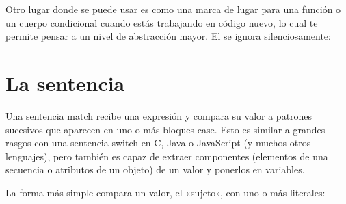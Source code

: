 \documentclass[a5paper,10pt,spanish]{sphinxmanual}
\begin{document}
\sphinxAtStartPar
Otro lugar donde se puede usar  es como una marca de lugar para una función o un cuerpo condicional cuando estás trabajando en código nuevo, lo cual te permite pensar a un nivel de abstracción mayor. El  se ignora silenciosamente:

\begin{sphinxVerbatim}[commandchars=\\\{\}]
 
       
\end{sphinxVerbatim}


\section{La sentencia }
\label{\detokenize{tutorial/controlflow:match-statements}}\label{\detokenize{tutorial/controlflow:tut-match}}
\sphinxAtStartPar
Una sentencia match recibe una expresión y compara su valor a patrones sucesivos que aparecen en uno o más bloques case. Esto es similar a grandes rasgos con una sentencia switch en C, Java o JavaScript (y muchos otros lenguajes), pero también es capaz de extraer componentes (elementos de una secuencia o atributos de un objeto) de un valor y ponerlos en variables.

\sphinxAtStartPar
La forma más simple compara un valor, el «sujeto», con uno o más literales:

\begin{sphinxVerbatim}[commandchars=\\\{\}]
 
     
         
             
         
             
         
             
         
             
\end{sphinxVerbatim}
\end{document}
